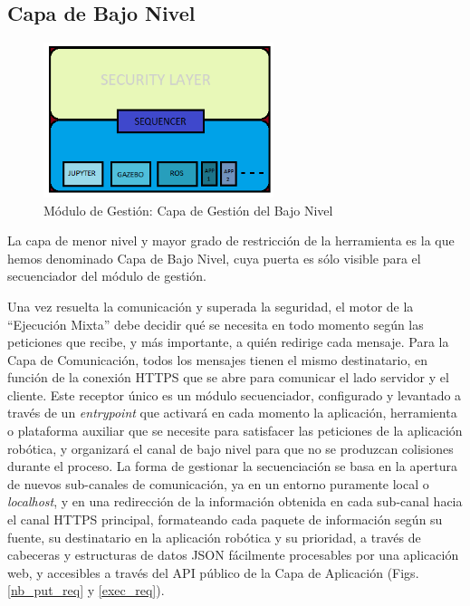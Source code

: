\subsection{Capa de Bajo Nivel}

\begin{figure}[!hbtp]  \centering\noindent
    \includegraphics[width=0.6\textwidth]{figures/layer1.png}
    \caption{Módulo de Gestión: Capa de Gestión del Bajo Nivel}
    \label{layer1}
\end{figure}

La capa de menor nivel y mayor grado de restricción de la herramienta es la que hemos denominado Capa de Bajo Nivel, cuya puerta es sólo visible para el secuenciador del módulo de gestión. 

Una vez resuelta la comunicación y superada la seguridad, el motor de la ``Ejecución Mixta'' debe decidir qué se necesita en todo momento según las peticiones que recibe, y más importante, a quién redirige cada mensaje. Para la Capa de Comunicación, todos los mensajes tienen el mismo destinatario, en función de la conexión HTTPS que se abre para comunicar el lado servidor y el cliente. Este receptor único es un módulo secuenciador, configurado y levantado a través de un \textit{entrypoint} que activará en cada momento la aplicación, herramienta o plataforma auxiliar que se necesite para satisfacer las peticiones de la aplicación robótica, y organizará el canal de bajo nivel para que no se produzcan colisiones durante el proceso. La forma de gestionar la secuenciación se basa en la apertura de nuevos sub-canales de comunicación, ya en un entorno puramente local o \textit{localhost}, y en una redirección de la información obtenida en cada sub-canal hacia el canal HTTPS principal, formateando cada paquete de información según su fuente, su destinatario en la aplicación robótica y su prioridad, a través de cabeceras y estructuras de datos JSON fácilmente procesables por una aplicación web, y accesibles a través del API público de la Capa de Aplicación (Figs. \ref{nb_put_req} y \ref{exec_req}).


